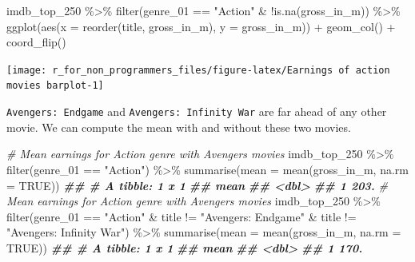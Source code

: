 \documentclass[
]{book}
\newenvironment{Shaded}{\begin{snugshade}}{\end{snugshade}}
\newcommand{\AttributeTok}[1]{\textcolor[rgb]{0.77,0.63,0.00}{#1}}
\newcommand{\CommentTok}[1]{\textcolor[rgb]{0.56,0.35,0.01}{\textit{#1}}}
\newcommand{\ConstantTok}[1]{\textcolor[rgb]{0.00,0.00,0.00}{#1}}
\newcommand{\DocumentationTok}[1]{\textcolor[rgb]{0.56,0.35,0.01}{\textbf{\textit{#1}}}}
\newcommand{\FunctionTok}[1]{\textcolor[rgb]{0.00,0.00,0.00}{#1}}
\newcommand{\NormalTok}[1]{#1}
\newcommand{\SpecialCharTok}[1]{\textcolor[rgb]{0.00,0.00,0.00}{#1}}
\newcommand{\StringTok}[1]{\textcolor[rgb]{0.31,0.60,0.02}{#1}}
\begin{document}
\begin{Shaded}
\begin{Highlighting}[]
\NormalTok{imdb\_top\_250 }\SpecialCharTok{\%\textgreater{}\%} 
  \FunctionTok{filter}\NormalTok{(genre\_01 }\SpecialCharTok{==} \StringTok{"Action"} \SpecialCharTok{\&} \SpecialCharTok{!}\FunctionTok{is.na}\NormalTok{(gross\_in\_m)) }\SpecialCharTok{\%\textgreater{}\%} 
  \FunctionTok{ggplot}\NormalTok{(}\FunctionTok{aes}\NormalTok{(}\AttributeTok{x =} \FunctionTok{reorder}\NormalTok{(title, gross\_in\_m), }\AttributeTok{y =}\NormalTok{ gross\_in\_m)) }\SpecialCharTok{+} 
  \FunctionTok{geom\_col}\NormalTok{() }\SpecialCharTok{+}
  \FunctionTok{coord\_flip}\NormalTok{()}
\end{Highlighting}
\end{Shaded}

\begin{center}\texttt{[image: r\_for\_non\_programmers\_files/figure-latex/Earnings of action movies barplot-1]} \end{center}

\texttt{Avengers:\ Endgame} and \texttt{Avengers:\ Infinity\ War} are far ahead of any other movie. We can compute the mean with and without these two movies.

\begin{Shaded}
\begin{Highlighting}[]
\CommentTok{\# Mean earnings for Action genre with Avengers movies}
\NormalTok{imdb\_top\_250 }\SpecialCharTok{\%\textgreater{}\%} 
  \FunctionTok{filter}\NormalTok{(genre\_01 }\SpecialCharTok{==} \StringTok{"Action"}\NormalTok{) }\SpecialCharTok{\%\textgreater{}\%} 
  \FunctionTok{summarise}\NormalTok{(}\AttributeTok{mean =} \FunctionTok{mean}\NormalTok{(gross\_in\_m, }\AttributeTok{na.rm =} \ConstantTok{TRUE}\NormalTok{))}
\DocumentationTok{\#\# \# A tibble: 1 x 1}
\DocumentationTok{\#\#    mean}
\DocumentationTok{\#\#   \textless{}dbl\textgreater{}}
\DocumentationTok{\#\# 1  203.}
\CommentTok{\# Mean earnings for Action genre with Avengers movies}
\NormalTok{imdb\_top\_250 }\SpecialCharTok{\%\textgreater{}\%} 
  \FunctionTok{filter}\NormalTok{(genre\_01 }\SpecialCharTok{==} \StringTok{"Action"} \SpecialCharTok{\&}
\NormalTok{           title }\SpecialCharTok{!=} \StringTok{"Avengers: Endgame"} \SpecialCharTok{\&}
\NormalTok{           title }\SpecialCharTok{!=} \StringTok{"Avengers: Infinity War"}\NormalTok{) }\SpecialCharTok{\%\textgreater{}\%} 
  \FunctionTok{summarise}\NormalTok{(}\AttributeTok{mean =} \FunctionTok{mean}\NormalTok{(gross\_in\_m, }\AttributeTok{na.rm =} \ConstantTok{TRUE}\NormalTok{))}
\DocumentationTok{\#\# \# A tibble: 1 x 1}
\DocumentationTok{\#\#    mean}
\DocumentationTok{\#\#   \textless{}dbl\textgreater{}}
\DocumentationTok{\#\# 1  170.}
\end{Highlighting}
\end{Shaded}
\end{document}
